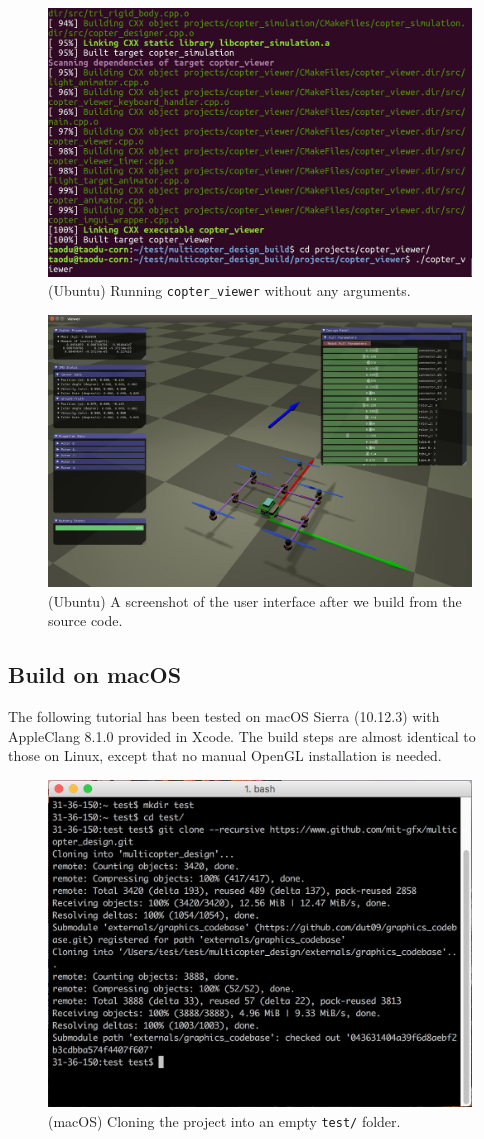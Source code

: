 \begin{figure}[!htb]
  \centering
  \includegraphics[width=0.75\linewidth]{ubuntu_run}
  \caption{(Ubuntu) Running \texttt{copter\_viewer} without any arguments.}
  \label{fig:ubuntu_run}
\end{figure}
\begin{figure}[!htb]
  \centering
  \includegraphics[width=0.75\linewidth]{ubuntu_default_ui}
  \caption{(Ubuntu) A screenshot of the user interface after we build from the source code.}
  \label{fig:ubuntu_default_ui}
\end{figure}

\subsection{Build on macOS}
The following tutorial has been tested on macOS Sierra (10.12.3) with AppleClang 8.1.0 provided in Xcode. The build steps are almost identical to those on Linux, except that no manual OpenGL installation is needed.

\begin{figure}[!htb]
  \centering
  \includegraphics[width=0.75\linewidth]{macos_git_clone}
  \caption{(macOS) Cloning the project into an empty \texttt{test/} folder.}
  \label{fig:macos_git_clone}
\end{figure}
